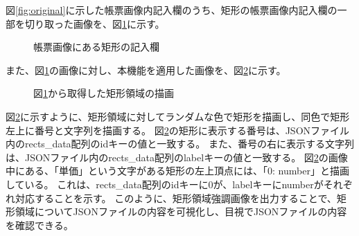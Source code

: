 図\ref{fig:original}に示した帳票画像内記入欄のうち、矩形の帳票画像内記入欄の一部を切り取った画像を、図\ref{fig:rect_original}に示す。
\begin{figure}[tp]
    \begin{center}
        \caption{帳票画像にある矩形の記入欄}
        \label{fig:rect_original}
    \end{center}
\end{figure}
また、図\ref{fig:rect_original}の画像に対し、本機能を適用した画像を、図\ref{fig:rect_drawing}に示す。
\begin{figure}[tp]
    \begin{center}
        \caption{図\ref{fig:rect_original}から取得した矩形領域の描画}
        \label{fig:rect_drawing}
    \end{center}
\end{figure}
図\ref{fig:rect_drawing}に示すように、矩形領域に対してランダムな色で矩形を描画し、同色で矩形左上に番号と文字列を描画する。
図\ref{fig:rect_drawing}の矩形に表示する番号は、JSONファイル内のrects\_data配列のidキーの値と一致する。
また、番号の右に表示する文字列は、JSONファイル内のrects\_data配列のlabelキーの値と一致する。
図\ref{fig:rect_drawing}の画像中にある、「単価」という文字がある矩形の左上頂点には、「0: number」と描画している。
これは、rects\_data配列のidキーに0が、labelキーにnumberがそれぞれ対応することを示す。
このように、矩形領域強調画像を出力することで、矩形領域についてJSONファイルの内容を可視化し、目視でJSONファイルの内容を確認できる。

